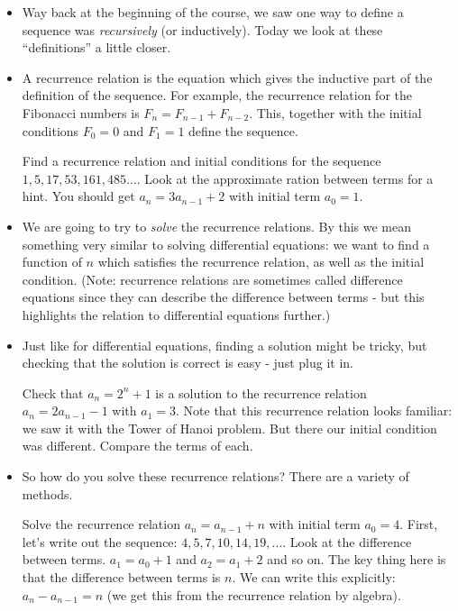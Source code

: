 \begin{itemize}
 \item Way back at the beginning of the course, we saw one way to define a sequence was {\em recursively} (or inductively).  Today we look at these ``definitions'' a little closer.
 
 \item A recurrence relation is the equation which gives the inductive part of the definition of the sequence.  For example, the recurrence relation for the Fibonacci numbers is $F_n = F_{n-1} + F_{n-2}$.  This, together with the initial conditions $F_0 = 0$ and $F_1 = 1$ define the sequence.
 
 \ex Find a recurrence relation and initial conditions for the sequence $1, 5, 17, 53, 161, 485\ldots$.  Look at the approximate ration between terms for a hint.  You should get $a_n = 3a_{n-1} + 2$ with initial term $a_0 = 1$.
 
 \item We are going to try to {\em solve} the recurrence relations.  By this we mean something very similar to solving differential equations: we want to find a function of $n$ which satisfies the recurrence relation, as well as the initial condition.  (Note: recurrence relations are sometimes called difference equations since they can describe the difference between terms - but this highlights the relation to differential equations further.)
 
 \item Just like for differential equations, finding a solution might be tricky, but checking that the solution is correct is easy - just plug it in.
 
 \ex Check that $a_n = 2^n + 1$ is a solution to the recurrence relation $a_n = 2a_{n-1} - 1$ with $a_1 = 3$.  Note that this recurrence relation looks familiar: we saw it with the Tower of Hanoi problem.  But there our initial condition was different.  Compare the terms of each.
 
 \item So how do you solve these recurrence relations?  There are a variety of methods.
 
 \ex Solve the recurrence relation $a_n = a_{n-1} + n$ with initial term $a_0 = 4$.  First, let's write out the sequence: $4, 5, 7, 10, 14, 19, \ldots$.  Look at the difference between terms.  $a_1 = a_0 + 1$ and $a_2 = a_1 + 2$ and so on.  The key thing here is that the difference between terms is $n$.  We can write this explicitly: $a_n - a_{n-1} = n$ (we get this from the recurrence relation by algebra).  
 

\end{itemize}
